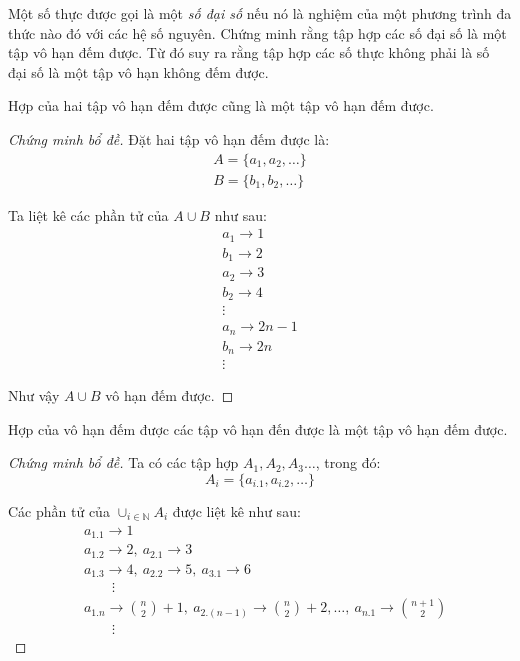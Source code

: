 \documentclass[class=linearalgebra,crop=false]{standalone}
\begin{document}
\begin{exercise}Một số thực được gọi là một \textit{số đại số} nếu nó là nghiệm của một phương trình đa thức nào đó với các hệ số nguyên. Chứng minh rằng tập hợp các số đại số là một tập vô hạn đếm được. Từ đó suy ra rằng tập hợp các số thực không phải là số đại số là một tập vô hạn không đếm được.
\end{exercise}

\begin{lemma}Hợp của hai tập vô hạn đếm được cũng là một tập vô hạn đếm được.
\end{lemma}

\begin{proof}[Chứng minh bổ đề] Đặt hai tập vô hạn đếm được là:
    \begin{gather*}
        A = \{ a_{1}, a_{2}, \ldots \} \\
        B = \{ b_{1}, b_{2}, \ldots \}
    \end{gather*}

    \par Ta liệt kê các phần tử của $A\cup B$ như sau:
    \begin{gather*}
        a_{1} \rightarrow 1 \\
        b_{1} \rightarrow 2 \\
        a_{2} \rightarrow 3 \\
        b_{2} \rightarrow 4 \\
        \vdots \\
        a_{n} \rightarrow 2n - 1 \\
        b_{n} \rightarrow 2n \\
        \vdots
    \end{gather*}
    \par Như vậy $A\cup B$ vô hạn đếm được.
\end{proof}

\begin{lemma}Hợp của vô hạn đếm được các tập vô hạn đến được là một tập vô hạn đếm được.
\end{lemma}

\begin{proof}[Chứng minh bổ đề]Ta có các tập hợp $A_{1}, A_{2}, A_{3} \ldots$, trong đó:
    \[ A_{i} = \{ a_{i.1}, a_{i.2}, \ldots \} \]
    \par Các phần tử của $\cup_{i\in \mathbb{N}}A_{i}$ được liệt kê như sau:
    \begin{align*}
        & a_{1.1} \rightarrow 1 \\
        & a_{1.2} \rightarrow 2,\ a_{2.1} \rightarrow 3 \\
        & a_{1.3} \rightarrow 4,\ a_{2.2} \rightarrow 5,\ a_{3.1} \rightarrow 6 \\
        & \qquad\vdots \\
        & a_{1.n} \rightarrow \binom{n}{2} + 1,\ a_{2.(n-1)} \rightarrow \binom{n}{2} + 2, \ldots,\ a_{n.1} \rightarrow \binom{n + 1}{2} \\
        & \qquad\vdots
    \end{align*}
\end{proof}
\end{document}
